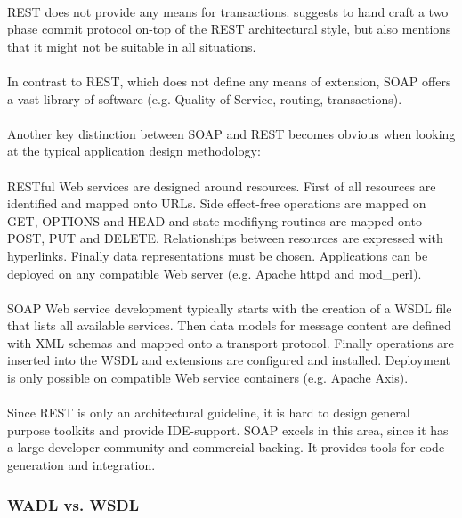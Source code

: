 \\
REST does not provide any means for transactions. \cite{RESTFULWEB} suggests to hand craft a two phase commit protocol on-top of the REST architectural style, but also mentions that it might not be suitable in all situations.
\\ \\
In contrast to REST, which does not define any means of extension, SOAP offers a vast library of software (e.g. Quality of Service, routing, transactions).
\\ \\
Another key distinction between SOAP and REST becomes obvious when looking at the typical application design methodology: 
\\ \\
RESTful Web services are designed around resources. First of all resources are identified and mapped onto URLs. Side effect-free operations are mapped on GET, OPTIONS and HEAD and state-modifiyng routines are mapped onto POST, PUT and DELETE. Relationships between resources are expressed with hyperlinks. Finally data representations must be chosen. Applications can be deployed on any compatible Web server (e.g. Apache httpd and mod\_perl). \cite{BIGREST}
\\ \\
SOAP Web service development typically starts with the creation of a WSDL file that lists all available services. Then data models for message content are defined with XML schemas and mapped onto a transport protocol. Finally operations are inserted into the WSDL and extensions are configured and installed. Deployment is only possible on compatible Web service containers (e.g. Apache Axis). \cite{BRINGBACKWEB}
\\ \\
Since REST is only an architectural guideline, it is hard to design general purpose toolkits and provide IDE-support. SOAP excels in this area, since it has a large developer community and commercial backing. It provides tools for code-generation and integration. 

\subsubsection{WADL vs. WSDL}

